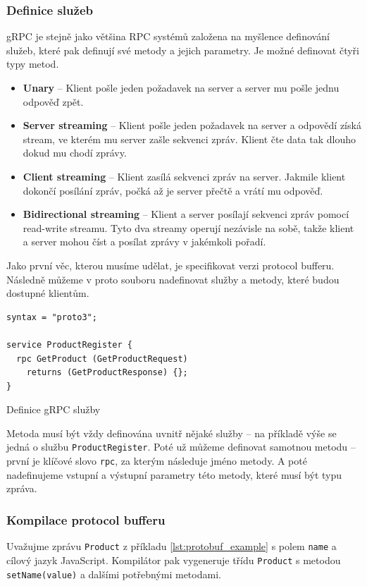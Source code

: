 \documentclass[thesis=M,czech]{FITthesis}[2019/12/23]
\begin{document}
\subsubsection*{Definice služeb}
gRPC je stejně jako většina RPC systémů založena na myšlence definování služeb, které pak definují své metody a jejich parametry. Je možné definovat čtyři typy metod.

\begin{itemize}
    \item \textbf{Unary} -- Klient pošle jeden požadavek na server a server mu pošle jednu odpověď zpět.
    \item \textbf{Server streaming} -- Klient pošle jeden požadavek na server a odpovědí získá stream, ve kterém mu server zašle sekvenci zpráv. Klient čte data tak dlouho dokud mu chodí zprávy.
    \item \textbf{Client streaming} -- Klient zasílá sekvenci zpráv na server. Jakmile klient dokončí posílání zpráv, počká až je server přečtě a vrátí mu odpověď.
    \item \textbf{Bidirectional streaming} -- Klient a server posílají sekvenci zpráv pomocí read-write streamu. Tyto dva streamy operují nezávisle na sobě, takže klient a server mohou číst a posílat zprávy v jakémkoli pořadí.
\end{itemize}

Jako první věc, kterou musíme udělat, je specifikovat verzi protocol bufferu. Následně můžeme v proto souboru nadefinovat služby a metody, které budou dostupné klientům.

\begin{listing}[H]
\begin{verbatim}
syntax = "proto3";

service ProductRegister {
  rpc GetProduct (GetProductRequest) 
    returns (GetProductResponse) {};
}
\end{verbatim}
\caption{Definice gRPC služby}
\label{lst:grpc_service}
\end{listing}

Metoda musí být vždy definována uvnitř nějaké služby -- na příkladě  výše se jedná o službu \texttt{ProductRegister}. Poté už můžeme definovat samotnou metodu -- první je klíčové slovo \texttt{rpc}, za kterým následuje jméno metody. A poté nadefinujeme vstupní a výstupní parametry této metody, které musí být typu zpráva.

\subsubsection*{Kompilace protocol bufferu}
Uvažujme zprávu \texttt{Product} z příkladu \ref{lst:protobuf_example} s polem  \texttt{name} a cílový jazyk JavaScript. Kompilátor pak vygeneruje třídu \texttt{Product} s metodou \texttt{setName(value)} a dalšími potřebnými metodami.
\end{document}
